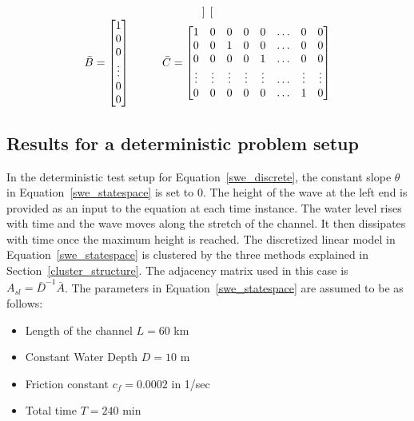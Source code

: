 \begin{equation}
\begin{array}{c}
\begin{bmatrix}
\end{bmatrix} \\
\bar{B} = \begin{bmatrix}
1 \\  0 \\ 0 \\ \vdots \\ 0 \\ 0
\end{bmatrix} \hspace{10mm}
\bar{C} = \begin{bmatrix}
1 & 0 & 0 & 0 & 0 & \ldots & 0  & 0 \\
0 & 0 & 1 & 0 & 0 & \ldots & 0  & 0 \\
0 & 0 & 0 & 0 & 1 & \ldots & 0  & 0 \\
\vdots & \vdots & \vdots & \vdots & \vdots & {\ldots } & \vdots & \vdots \\
0 & 0 & 0 & 0 & 0 & \ldots  & 1 & 0 \\
\end{bmatrix}
\end{array}
\end{equation}

\subsection{Results for a deterministic problem setup}
\label{deterministic}

In the deterministic test setup for Equation~\ref{swe_discrete}, the constant slope $ \theta $ in Equation~\ref{swe_statespace} is set to 0. The height of the wave at the left end is provided as an input to the equation at each time instance. The water level rises with time and the wave moves along the stretch of the channel. It then dissipates with time once the maximum height is reached. The discretized linear model in Equation~\ref{swe_statespace} is clustered by the three methods explained in Section~\ref{cluster_structure}. The adjacency matrix used in this case is $A_{sl} = \bar{D}^{-1} \bar{A}$. The parameters in Equation~\ref{swe_statespace} are assumed to be as follows:

\begin{itemize}
\item Length of the channel $L = 60$ km
\item Constant Water Depth $D = 10$ m
\item Friction constant $c_f = 0.0002$ in 1/sec
\item Total time $T = 240$ min
\end{itemize}


